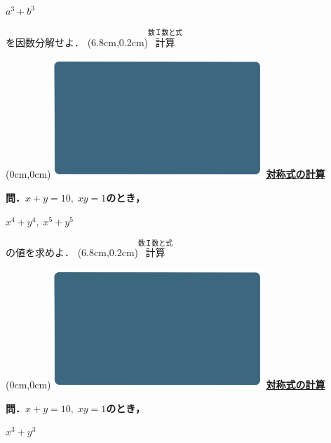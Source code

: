 \documentclass[10pt,
fleqn,
dvipdfmx,
uplatex
]{jsarticle}
\begin{document}
\HUGE 
\bf\boldmath 
\hspace{2zw}$a^3+b^3$

\Large
\vspace{1zw}
\hfill を因数分解せよ．
\at(6.8cm,0.2cm){\small\color{bradorange}$\overset{\text{数Ｉ数と式}}{\text{計算}}$}


\newpage



\at(0cm,0cm){\includegraphics[width=8cm,bb=0 0 1920 1080]{./thumbnails/templates/smart_background/数I数と式.jpeg}}
{\color{orange}\bf\boldmath\huge\underline{対称式の計算}}\vspace{0.3zw}

\Large 
\bf\boldmath 問．$x+y={10},\;xy=1$のとき，

\Huge
\hspace{0.2zw}$x^4+y^4,\;x^5+y^5$\vspace{0.3zw}

\Large
\hfill の値を求めよ．
\at(6.8cm,0.2cm){\small\color{bradorange}$\overset{\text{数Ｉ数と式}}{\text{計算}}$}


\newpage



\at(0cm,0cm){\includegraphics[width=8cm,bb=0 0 1920 1080]{./thumbnails/templates/smart_background/数I数と式.jpeg}}
{\color{orange}\bf\boldmath\huge\underline{対称式の計算}}\vspace{0.3zw}

\Large 
\bf\boldmath 問．$x+y={10},\;xy=1$のとき，

\HUGE
\hspace{2zw}$x^3+y^3$\vspace{0.3zw}
\end{document}
